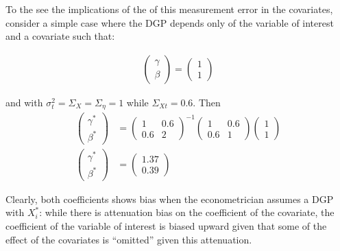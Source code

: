 \documentclass[12pt]{article}
\begin{document}
        To the see the implications of the of this measurement error in the covariates, consider a simple case where the DGP depends only of the variable of interest and a covariate such that:

        \begin{align}
            \left(\begin{array}{l}
        {\gamma} \\
        {\beta}
        \end{array}\right)=\left(\begin{array}{l}
        1 \\
        1
        \end{array}\right)
        \end{align}

        and with $\sigma^2_t=\Sigma_X=\Sigma_\eta=1$ while $\Sigma_{Xt}=0.6$. Then
        \begin{align*}
            \left(\begin{array}{l}
        {\gamma}^* \\
        {\beta}^*
        \end{array}\right)& =\left(\begin{array}{cc}
        1 & 0.6 \\
        0.6 & 2
        \end{array}\right)^{-1}\left(\begin{array}{cc}
        1 & 0.6 \\
        0.6 & 1
        \end{array}\right)\left(\begin{array}{l}
        1\\
        1
        \end{array}\right) \\
        \left(\begin{array}{l}
        {\gamma}^* \\
        {\beta}^*
        \end{array}\right)&=\left(\begin{array}{l}
        1.37 \\
        0.39
        \end{array}\right)
        \end{align*}

        Clearly, both coefficients shows bias when the econometrician assumes a DGP with $X_i^*$: while there is attenuation bias on the coefficient of the covariate, the coefficient of the variable of interest is biased upward given that some of the effect of the covariates is ``omitted'' given this attenuation.
\end{document}
